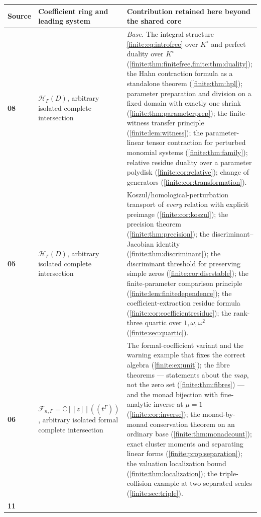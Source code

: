 \documentclass[11pt,letterpaper]{article}
\theoremstyle{definition}
\theoremstyle{remark}
\newcommand{\C}{\mathbb C}
\newcommand{\HH}{\mathscr H}
\newcommand{\Af}{\mathscr F}
\newcommand{\Kc}{K^{\circ}}
\numberwithin{equation}{section}
\begin{document}
\begin{center}\small
\begin{longtable}{@{}L{0.09\textwidth}L{0.30\textwidth}L{0.55\textwidth}@{}}
\toprule
Source & Coefficient ring and leading system & Contribution retained here beyond the shared core\\
\midrule
\endhead
\textbf{08} &
$\HH_\Gamma(D)$, arbitrary isolated complete intersection &
\emph{Base.} The integral structure \eqref{finite:eq:introfree} over $\Kc$ and perfect duality over $\Kc$ (\cref{finite:thm:finitefree,finite:thm:duality}); the Hahn contraction formula as a standalone theorem (\cref{finite:thm:hpl}); parameter preparation and division on a fixed domain with exactly one shrink (\cref{finite:thm:parameterprep}); the finite-witness transfer principle (\cref{finite:lem:witness}); the parameter-linear tensor contraction for perturbed monomial systems (\cref{finite:thm:family}); relative residue duality over a parameter polydisk (\cref{finite:cor:relative}); change of generators (\cref{finite:cor:transformation}).\\[0.35em]
\textbf{05} &
$\HH_\Gamma(D)$, arbitrary isolated complete intersection &
Koszul/homological-perturbation transport of \emph{every} relation with explicit preimage (\cref{finite:cor:koszul}); the precision theorem (\cref{finite:thm:precision}); the discriminant--Jacobian identity (\cref{finite:thm:discriminant}); the discriminant threshold for preserving simple zeros (\cref{finite:cor:discstable}); the finite-parameter comparison principle (\cref{finite:lem:finitedependence}); the coefficient-extraction residue formula (\cref{finite:cor:coefficientresidue}); the rank-three quartic over $1,\omega,\omega^2$ (\cref{finite:sec:quartic}).\\[0.35em]
\textbf{06} &
$\Af_{n,\Gamma}=\C[[z]]((t^\Gamma))$, arbitrary isolated formal complete intersection &
The formal-coefficient variant and the warning example that fixes the correct algebra (\cref{finite:ex:unit}); the fibre theorems --- statements about the \emph{map}, not the zero set (\cref{finite:thm:fibres}) --- and the monad bijection with fine-analytic inverse at $\mu=1$ (\cref{finite:cor:inverse}); the monad-by-monad conservation theorem on an ordinary base (\cref{finite:thm:monadcount}); exact cluster moments and separating linear forms (\cref{finite:prop:separation}); the valuation localization bound (\cref{finite:thm:localization}); the triple-collision example at two separated scales (\cref{finite:sec:triple}).\\[0.35em]
\textbf{11} &

\end{longtable}
\end{center}
\end{document}
